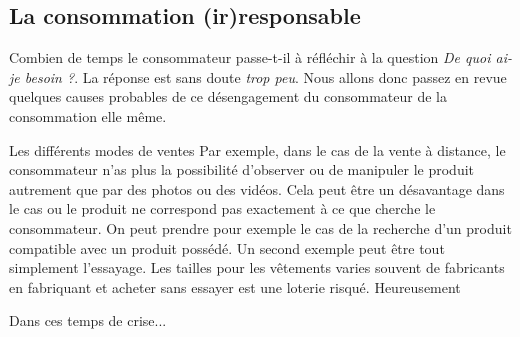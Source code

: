 \subsection{La consommation (ir)responsable}

Combien de temps le consommateur passe-t-il à réfléchir à la question \textit{De quoi ai-je besoin ?}.
La réponse est sans doute \textit{trop peu}. Nous allons donc passez en revue quelques causes probables de ce désengagement du consommateur de la consommation elle même.

\medbreak
Les différents modes de ventes 
Par exemple, dans le cas de la vente à distance, le consommateur n'as plus la possibilité d'observer ou de manipuler le produit autrement que par des photos ou des vidéos.
Cela peut être un désavantage dans le cas ou le produit ne correspond pas exactement à ce que cherche le consommateur.
\smallbreak
On peut prendre pour exemple le cas de la recherche d'un produit compatible avec un produit possédé.
Un second exemple peut être tout simplement l'essayage. Les tailles pour les vêtements varies souvent de fabricants en fabriquant et acheter sans essayer est une loterie risqué.
\smallbreak
 Heureusement %

\medbreak
Dans ces temps de crise... %


